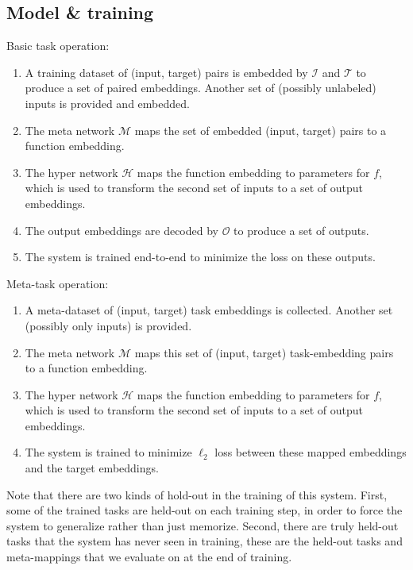 \documentclass{article}
\begin{document}
\subsection{Model \& training} \label{app_model_details}
Basic task operation:
\begin{enumerate}
\item A training dataset of (input, target) pairs is embedded by $\mathcal{I}$ and $\mathcal{T}$ to produce a set of paired embeddings. Another set of (possibly unlabeled) inputs is provided and embedded.
\item The meta network $\mathcal{M}$ maps the set of embedded (input, target) pairs to a function embedding.
\item The hyper network $\mathcal{H}$ maps the function embedding to parameters for $f$, which is used to transform the second set of inputs to a set of output embeddings.
\item The output embeddings are decoded by $\mathcal{O}$ to produce a set of outputs.
\item The system is trained end-to-end to minimize the loss on these outputs.
\end{enumerate}
Meta-task operation:
\begin{enumerate}
\item A meta-dataset of (input, target) task embeddings is collected. Another set (possibly only inputs) is provided.
\item The meta network $\mathcal{M}$ maps this set of (input, target) task-embedding pairs to a function embedding.
\item The hyper network $\mathcal{H}$ maps the function embedding to parameters for $f$, which is used to transform the second set of inputs to a set of output embeddings.
\item The system is trained to minimize $\ell_2$ loss between these mapped embeddings and the target embeddings. 
\end{enumerate}
Note that there are two kinds of hold-out in the training of this system. First, some of the trained tasks are held-out on each training step, in order to force the system to generalize rather than just memorize. Second, there are truly held-out tasks that the system has never seen in training, these are the held-out tasks and meta-mappings that we evaluate on at the end of training.
\end{document}
